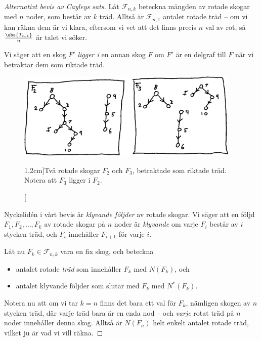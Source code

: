 \documentclass[nobib]{tufte-handout}
\begin{document}
\begin{proof}[Alternativt bevis av Cayleys sats]
    Låt $\mathcal{F}_{n,k}$ beteckna mängden av rotade skogar med $n$ noder, som består av $k$ träd. Alltså är $\mathcal{F}_{n,1}$ antalet rotade träd -- om vi kan räkna dem är vi klara, eftersom vi vet att det finns precis $n$ val av rot, så $\frac{\abs{T_{n,1}}}{n}$ är talet vi söker.

    Vi säger att en skog $F'$ \emph{ligger i} en annan skog $F$ om $F'$ är en delgraf till $F$ när vi betraktar dem som riktade träd.

    \begin{figure}
        \centering
        \includegraphics[width=0.95\textwidth]{graphics/rooted_forest_subforest.png}
        \caption[][1.2cm]{Två rotade skogar $F_2$ och $F_3$, betraktade som riktade träd. Notera att $F_3$ ligger i $F_2$.}
        \label{fig:two_rooted_forests}
    \end{figure}

    Nyckelidén i vårt bevis är \emph{klyvande följder} av rotade skogar. Vi säger att en följd $F_1, F_2,\ldots, F_k$ av rotade skogar på $n$ noder är \emph{klyvande} om varje $F_i$ består av $i$ stycken träd, och $F_{i}$ innehåller $F_{i+1}$ för varje $i$.

    Låt nu $F_k \in \mathcal{F}_{n,k}$ vara en fix skog, och beteckna
    \begin{itemize}
        \item antalet rotade \emph{träd} som innehåller $F_k$ med $N(F_k)$, och
        \item antalet klyvande följder som slutar med $F_k$ med $N^*(F_k)$.
    \end{itemize}

    Notera nu att om vi tar $k = n$ finns det bara ett val för $F_k$, nämligen skogen av $n$ stycken träd, där varje träd bara är en enda nod -- och \emph{varje} rotat träd på $n$ noder innehåller denna skog. Alltså är $N(F_n)$ helt enkelt antalet rotade träd, vilket ju är vad vi vill räkna.


\end{proof}
\end{document}
